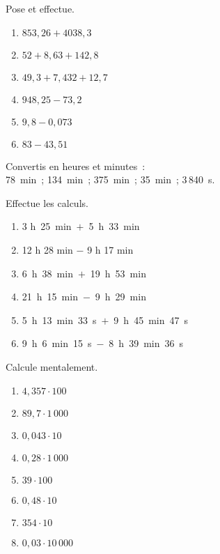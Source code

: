 \begin{exercice}
Pose et effectue.
\begin{enumerate} 
 \item $853,26 + 4 038,3$
 \item $52 + 8,63 + 142,8$
 \item $49,3 + 7,432 + 12,7$
 \item $948,25 - 73,2$
 \item $9,8 - 0,073$
 \item $83 - 43,51$
 \end{enumerate} 
 \end{exercice}


\begin{exercice}
Convertis en heures et minutes :\\
78 min ; 134 min ; 375 min ; 35 min ; 3\,840 s.
\end{exercice}


\begin{exercice}
Effectue les calculs.
\begin{enumerate} 
 \item 3 h 25 min $+$ 5 h 33 min
 \item 12 h 28 min $-$ 9 h 17 min
 \item 6 h 38 min $+$ 19 h 53 min
 \item 21 h 15 min $-$ 9 h 29 min
 \item 5 h 13 min 33 s $+$ 9 h 45 min 47 s
 \item 9 h 6 min 15 s $-$ 8 h 39 min 36 s
 \end{enumerate}
\end{exercice}


\begin{exercice}
Calcule mentalement.
\begin{enumerate} 
 \item $4,357 \cdot 100$ \dotfill \hspace*{11em}
 
 \item $89,7 \cdot 1\,000$ \dotfill \hspace*{11em}
 
 \item $0,043 \cdot 10$ \dotfill \hspace*{11em}
 
 \item $0,28 \cdot 1\,000$ \dotfill \hspace*{11em}
 
 \item $39 \cdot 100$ \dotfill \hspace*{11em}
 
 \item $0,48 \cdot 10$ \dotfill \hspace*{11em}
 	
 \item $354 \cdot 10$ \dotfill \hspace*{11em}
 	
 \item $0,03 \cdot 10\,000$ \dotfill \hspace*{11em}
 
 \end{enumerate}
\end{exercice}


